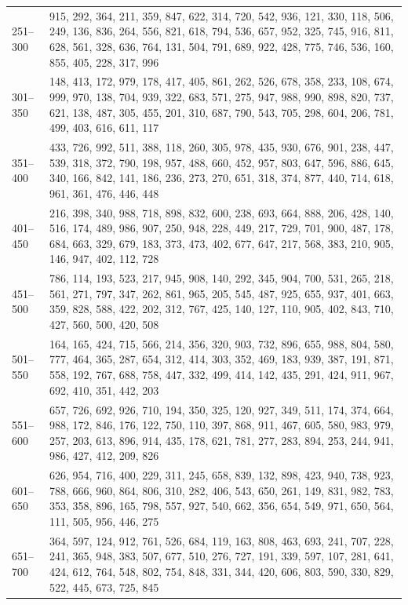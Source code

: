 \documentclass[a4paper, 12pt]{book}
\begin{document}
\begin{appendices}
\begin{table}
\begin{center}
\begin{tabulary}{1.0\textwidth}{p{1.3cm} p{11.58cm}}
      251--300 & 915, 292, 364, 211, 359, 847, 622, 314, 720, 542, 936, 121, 330, 118, 506, 249, 136, 836, 264, 556, 821, 618, 794, 536, 657, 952, 325, 745, 916, 811, 628, 561, 328, 636, 764, 131, 504, 791, 689, 922, 428, 775, 746, 536, 160, 855, 405, 228, 317, 996 \\
      301--350 & 148, 413, 172, 979, 178, 417, 405, 861, 262, 526, 678, 358, 233, 108, 674, 999, 970, 138, 704, 939, 322, 683, 571, 275, 947, 988, 990, 898, 820, 737, 621, 138, 487, 305, 455, 201, 310, 687, 790, 543, 705, 298, 604, 206, 781, 499, 403, 616, 611, 117 \\
      351--400 & 433, 726, 992, 511, 388, 118, 260, 305, 978, 435, 930, 676, 901, 238, 447, 539, 318, 372, 790, 198, 957, 488, 660, 452, 957, 803, 647, 596, 886, 645, 340, 166, 842, 141, 186, 236, 273, 270, 651, 318, 374, 877, 440, 714, 618, 961, 361, 476, 446, 448 \\
      401--450 & 216, 398, 340, 988, 718, 898, 832, 600, 238, 693, 664, 888, 206, 428, 140, 516, 174, 489, 986, 907, 250, 948, 228, 449, 217, 729, 701, 900, 487, 178, 684, 663, 329, 679, 183, 373, 473, 402, 677, 647, 217, 568, 383, 210, 905, 146, 947, 402, 112, 728 \\
      451--500 & 786, 114, 193, 523, 217, 945, 908, 140, 292, 345, 904, 700, 531, 265, 218, 561, 271, 797, 347, 262, 861, 965, 205, 545, 487, 925, 655, 937, 401, 663, 359, 828, 588, 422, 202, 312, 767, 425, 140, 127, 110, 905, 402, 843, 710, 427, 560, 500, 420, 508 \\
      501--550 & 164, 165, 424, 715, 566, 214, 356, 320, 903, 732, 896, 655, 988, 804, 580, 777, 464, 365, 287, 654, 312, 414, 303, 352, 469, 183, 939, 387, 191, 871, 558, 192, 767, 688, 758, 447, 332, 499, 414, 142, 435, 291, 424, 911, 967, 692, 410, 351, 442, 203 \\
      551--600 & 657, 726, 692, 926, 710, 194, 350, 325, 120, 927, 349, 511, 174, 374, 664, 988, 172, 846, 176, 122, 750, 110, 397, 868, 911, 467, 605, 580, 983, 979, 257, 203, 613, 896, 914, 435, 178, 621, 781, 277, 283, 894, 253, 244, 941, 986, 427, 412, 209, 826 \\
      601--650 & 626, 954, 716, 400, 229, 311, 245, 658, 839, 132, 898, 423, 940, 738, 923, 788, 666, 960, 864, 806, 310, 282, 406, 543, 650, 261, 149, 831, 982, 783, 353, 358, 896, 165, 798, 557, 927, 540, 662, 356, 654, 549, 971, 650, 564, 111, 505, 956, 446, 275 \\
      651--700 & 364, 597, 124, 912, 761, 526, 684, 119, 163, 808, 463, 693, 241, 707, 228, 241, 365, 948, 383, 507, 677, 510, 276, 727, 191, 339, 597, 107, 281, 641, 424, 612, 764, 548, 802, 754, 848, 331, 344, 420, 606, 803, 590, 330, 829, 522, 445, 673, 725, 845 \\

\end{tabulary}
\end{center}
\end{table}
\end{appendices}
\end{document}
